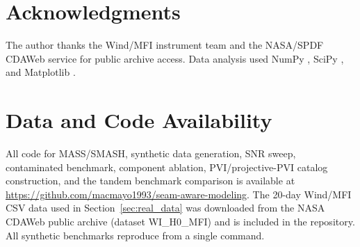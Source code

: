 \documentclass[12pt,letterpaper]{article}
\begin{document}
\section*{Acknowledgments}

The author thanks the Wind/MFI instrument team \citep{Lepping1995} and the
NASA/SPDF CDAWeb service for public archive access.
Data analysis used NumPy \citep{Harris2020}, SciPy \citep{Virtanen2020},
and Matplotlib \citep{Hunter2007}.

\section*{Data and Code Availability}

All code for MASS/SMASH, synthetic data generation, SNR sweep, contaminated
benchmark, component ablation, PVI/projective-PVI catalog construction,
and the tandem benchmark comparison is available at
\url{https://github.com/macmayo1993/seam-aware-modeling}.
The 20-day Wind/MFI CSV data used in Section~\ref{sec:real_data} was
downloaded from the NASA CDAWeb public archive (dataset WI\_H0\_MFI) and
is included in the repository.
All synthetic benchmarks reproduce from a single command.
\end{document}
